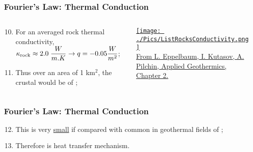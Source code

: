 \documentclass[10pt,compress,unknownkeysallowed]{beamer}
\begin{document}
\begin{frame}
 \frametitle{Fourier's Law: Thermal Conduction}
  \begin{columns}
    \begin{column}[c]{0.4\linewidth}
      \begin{enumerate}[1.]\setcounter{enumi}{9}%
        \item <1-> For an averaged rock thermal conductivity, $\kappa_{\text{rock}}\approx 2.0\;\displaystyle\frac{W}{m.K}\rightarrow q=-0.05\displaystyle\frac{W}{m^{2}}$;
        \item <2-> Thus over an area of 1 km$^{2}$, the crustal  would be of ;
      \end{enumerate}
    \end{column}
    \begin{column}[c]{0.6\linewidth}
          \href{http://www.springer.com/cda/content/document/cda_downloaddocument/9783642340222-c2.pdf?SGWID=0-0-45-1456221-p174676272}{\hspace{-1.cm}\texttt{[image: ./Pics/ListRocksConductivity.png]}\\
          \scriptsize From L. Eppelbaum, I. Kutasov, A. Pilchin, Applied Geothermics, Chapter 2.}
    \end{column}  
  \end{columns}
\end{frame} 



\begin{frame}
 \frametitle{Fourier's Law: Thermal Conduction}
    \begin{enumerate}[1.]\setcounter{enumi}{11} \scriptsize
       \item <1-> This is very \underline{small} if compared with common  in geothermal fields of ;
       \item <2-> Therefore \underline{} is  heat transfer mechanism.
    \end{enumerate}

\end{frame}
\end{document}
